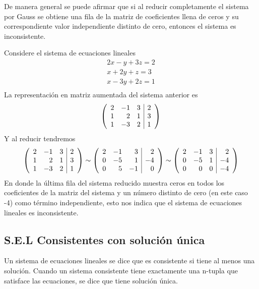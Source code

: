 De manera general se puede afirmar que si al reducir completamente el sistema por Gauss se obtiene una fila de la matriz de coeficientes llena de ceros y su correspondiente valor independiente distinto de cero, entonces el sistema es inconsistente.
\begin{ejemplo}
Considere el sistema de ecuaciones lineales
\begin{align*}
2x-y+3z=2\\
x+2y+z=3\\
x-3y+2z=1\\
\end{align*}
La representación en matriz aumentada del sistema anterior es
\begin{align*}
\reducir{rrr|r}{
2&-1&3&2\\
1&2&1&3\\
1&-3&2&1\\
}
\end{align*}
Y al reducir tendremos
\begin{align*}
\reducir{rrr|r}{
2&-1&3&2\\
1&2&1&3\\
1&-3&2&1\\
}
\sim
\reducir{rrr|r}{
2&-1&3&2\\
0&-5&1&-4\\
0&5&-1&0\\
}
\sim
\reducir{rrr|r}{
2&-1&3&2\\
0&-5&1&-4\\
0&0&0&-4\\
}
\end{align*}
En donde la última fila del sistema reducido muestra ceros en todos los coeficientes de la matriz del sistema y un número distinto de cero (en este caso -4) como término independiente, esto nos indica que el sistema de ecuaciones lineales es inconsistente.

\end{ejemplo}

\subsection{S.E.L Consistentes con solución única}
Un sistema de ecuaciones lineales se dice que es consistente si tiene al menos una solución. Cuando un sistema consistente tiene exactamente una n-tupla que satisface las ecuaciones, se dice que tiene solución única.

